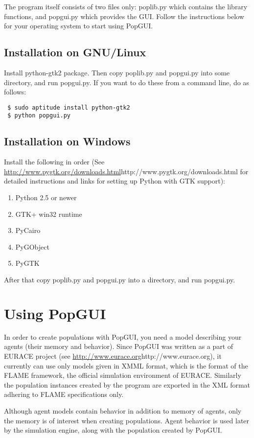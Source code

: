 \documentclass[10pt]{article}
\begin{document}
The program itself consists of two files only: poplib.py which contains the library functions, and popgui.py which provides the GUI. Follow the instructions below for your operating system to start using PopGUI.

\subsection{Installation on GNU/Linux}
Install python-gtk2 package. Then copy poplib.py and popgui.py into some directory, and run popgui.py. If you want to do these from a command line, do as follows:
\begin{verbatim}
 $ sudo aptitude install python-gtk2
 $ python popgui.py
\end{verbatim}

\subsection{Installation on Windows}
Install the following in order (See \url{http://www.pygtk.org/downloads.html}{http://www.pygtk.org/downloads.html} for detailed instructions and links for setting up Python with GTK support):
\begin{enumerate}
\item Python 2.5 or newer
\item GTK+ win32 runtime
\item PyCairo
\item PyGObject
\item PyGTK
\end{enumerate}

After that copy poplib.py and popgui.py into a directory, and run popgui.py.

\section{Using PopGUI}
In order to create populations with PopGUI, you need a model describing your agents (their memory and behavior). Since PopGUI was written as a part of EURACE project (see \url{http://www.eurace.org}{http://www.eurace.org}), it currently can use only  models given in XMML format, which is the format of the FLAME framework, the official simulation environment of EURACE. Similarly the population instances created by the program are exported in the XML format adhering to FLAME specifications only. 

Although agent models contain behavior in addition to memory of agents, only the memory is of interest when creating populations. Agent behavior is used later by the simulation engine, along with the population created by PopGUI.
\end{document}
